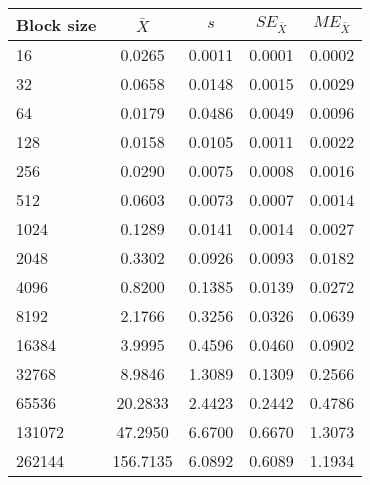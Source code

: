 \begin{tabular}{lcccc}\toprule
{\small Block size} & $\bar{X}$ & $s$ & $SE_{\bar{X}}$ & $ME_{\bar{X}}$ \\\midrule
16 & 0.0265 & 0.0011 & 0.0001 & 0.0002\\
32 & 0.0658 & 0.0148 & 0.0015 & 0.0029\\
64 & 0.0179 & 0.0486 & 0.0049 & 0.0096\\
128 & 0.0158 & 0.0105 & 0.0011 & 0.0022\\
256 & 0.0290 & 0.0075 & 0.0008 & 0.0016\\
512 & 0.0603 & 0.0073 & 0.0007 & 0.0014\\
1024 & 0.1289 & 0.0141 & 0.0014 & 0.0027\\
2048 & 0.3302 & 0.0926 & 0.0093 & 0.0182\\
4096 & 0.8200 & 0.1385 & 0.0139 & 0.0272\\
8192 & 2.1766 & 0.3256 & 0.0326 & 0.0639\\
16384 & 3.9995 & 0.4596 & 0.0460 & 0.0902\\
32768 & 8.9846 & 1.3089 & 0.1309 & 0.2566\\
65536 & 20.2833 & 2.4423 & 0.2442 & 0.4786\\
131072 & 47.2950 & 6.6700 & 0.6670 & 1.3073\\
262144 & 156.7135 & 6.0892 & 0.6089 & 1.1934\\
\bottomrule
\end{tabular}
